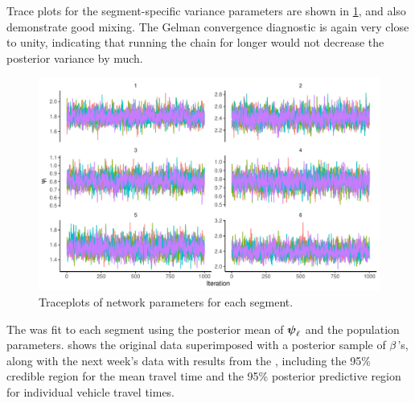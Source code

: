Trace plots for the segment-specific variance parameters are shown in \cref{fig:nw_model_n2_diag_2}, and also demonstrate good mixing. The Gelman convergence diagnostic is again very close to unity, indicating that running the chain for longer would not decrease the posterior variance by much.



\begin{knitrout}\small
{}\color{fgcolor}\begin{figure}

{\centering \includegraphics[width=\textwidth]{figure/nw_model_n2_diag_2-1} 

}

\caption[Traceplots of network parameters for each segment]{Traceplots of network parameters for each segment.}\label{fig:nw_model_n2_diag_2}
\end{figure}


\end{knitrout}


The \kf{} was fit to each segment using the posterior mean of $\mathbf{\boldsymbol{\psi}}_\ell$ and the population parameters.  shows the original data superimposed with a posterior sample of $\beta$'s, along with the next week's data with results from the \kf{}, including the 95\% credible region for the mean travel time and the 95\% posterior predictive region for individual vehicle travel times.







